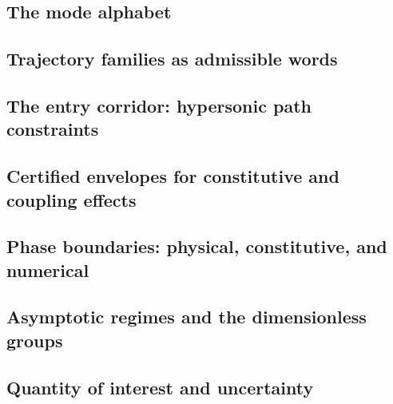 \subsection{The mode alphabet}
\label{sub:mode_alphabet}

\subsection{Trajectory families as admissible words}
\label{sub:trajectory_families_as_words}

\subsection{The entry corridor: hypersonic path constraints}
\label{sub:entry_corridor}

\subsection{Certified envelopes for constitutive and coupling effects}
\label{sub:certified_envelopes}

\subsection{Phase boundaries: physical, constitutive, and numerical}
\label{sub:phase_boundaries}

\subsection{Asymptotic regimes and the dimensionless groups}
\label{sub:asymptotic_regimes}

\subsection{Quantity of interest and uncertainty}
\label{sub:quantity_of_interest_and_uncertainty}
